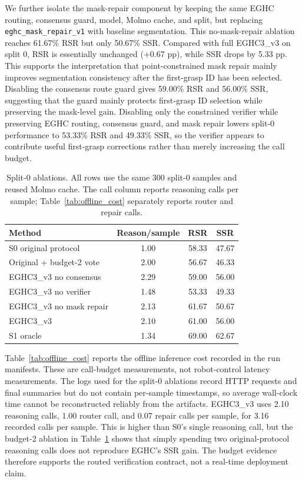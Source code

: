 We further isolate the mask-repair component by keeping the same EGHC routing, consensus guard, model, Molmo cache, and split, but replacing \texttt{eghc\_mask\_repair\_v1} with baseline segmentation. This no-mask-repair ablation reaches 61.67\% RSR but only 50.67\% SSR. Compared with full EGHC3\_v3 on split 0, RSR is essentially unchanged (+0.67 pp), while SSR drops by 5.33 pp. This supports the interpretation that point-constrained mask repair mainly improves segmentation consistency after the first-grasp ID has been selected. Disabling the consensus route guard gives 59.00\% RSR and 56.00\% SSR, suggesting that the guard mainly protects first-grasp ID selection while preserving the mask-level gain. Disabling only the constrained verifier while preserving EGHC routing, consensus guard, and mask repair lowers split-0 performance to 53.33\% RSR and 49.33\% SSR, so the verifier appears to contribute useful first-grasp corrections rather than merely increasing the call budget.

\begin{table}[t]
\centering
\caption{Split-0 ablations. All rows use the same 300 split-0 samples and reused Molmo cache. The call column reports reasoning calls per sample; Table~\ref{tab:offline_cost} separately reports router and repair calls.}
\label{tab:call_budget}
\scriptsize
\begin{tabular}{@{}lccc@{}}
\toprule
Method & Reason/sample & RSR & SSR \\
\midrule
S0 original protocol & 1.00 & 58.33 & 47.67 \\
Original + budget-2 vote & 2.00 & 56.67 & 46.33 \\
EGHC3\_v3 no consensus & 2.29 & 59.00 & 56.00 \\
EGHC3\_v3 no verifier & 1.48 & 53.33 & 49.33 \\
EGHC3\_v3 no mask repair & 2.13 & 61.67 & 50.67 \\
EGHC3\_v3 & 2.10 & 61.00 & 56.00 \\
S1 oracle & 1.34 & 69.00 & 62.67 \\
\bottomrule
\end{tabular}
\end{table}

Table~\ref{tab:offline_cost} reports the offline inference cost recorded in the run manifests. These are call-budget measurements, not robot-control latency measurements. The logs used for the split-0 ablations record HTTP requests and final summaries but do not contain per-sample timestamps, so average wall-clock time cannot be reconstructed reliably from the artifacts. EGHC3\_v3 uses 2.10 reasoning calls, 1.00 router call, and 0.07 repair calls per sample, for 3.16 recorded calls per sample. This is higher than S0's single reasoning call, but the budget-2 ablation in Table~\ref{tab:call_budget} shows that simply spending two original-protocol reasoning calls does not reproduce EGHC's SSR gain. The budget evidence therefore supports the routed verification contract, not a real-time deployment claim.

